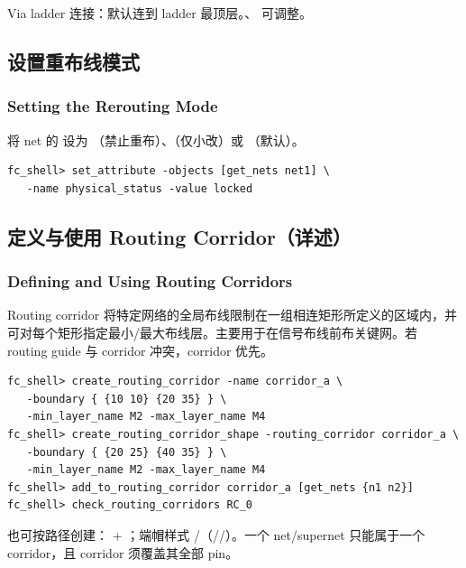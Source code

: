Via ladder 连接：默认连到 ladder 最顶层。、 可调整。

\subsection{设置重布线模式}
\subsubsection*{Setting the Rerouting Mode}

将 net 的  设为 （禁止重布）、（仅小改）或 （默认）。

\begin{lstlisting}
fc_shell> set_attribute -objects [get_nets net1] \
   -name physical_status -value locked
\end{lstlisting}


\subsection{定义与使用 Routing Corridor（详述）}
\subsubsection*{Defining and Using Routing Corridors}

Routing corridor 将特定网络的全局布线限制在一组相连矩形所定义的区域内，并可对每个矩形指定最小/最大布线层。主要用于在信号布线前布关键网。若 routing guide 与 corridor 冲突，corridor 优先。

\begin{lstlisting}
fc_shell> create_routing_corridor -name corridor_a \
   -boundary { {10 10} {20 35} } \
   -min_layer_name M2 -max_layer_name M4
fc_shell> create_routing_corridor_shape -routing_corridor corridor_a \
   -boundary { {20 25} {40 35} } \
   -min_layer_name M2 -max_layer_name M4
fc_shell> add_to_routing_corridor corridor_a [get_nets {n1 n2}]
fc_shell> check_routing_corridors RC_0
\end{lstlisting}

也可按路径创建：\opt{-path} + \opt{-width}；端帽样式 /（//）。一个 net/supernet 只能属于一个 corridor，且 corridor 须覆盖其全部 pin。

